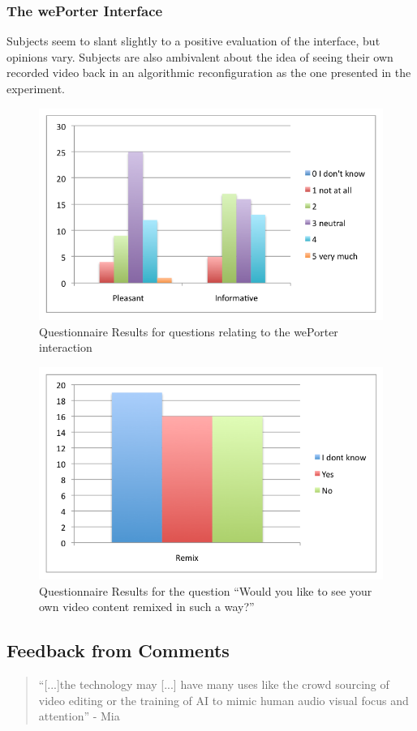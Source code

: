 \subsubsection{The wePorter Interface} 

Subjects seem to slant slightly to a positive evaluation of the interface, but opinions vary. Subjects are also ambivalent about the idea of seeing their own recorded video back in an algorithmic reconfiguration as the one presented in the experiment.

\begin{figure}[htbp]
  \centering
    \includegraphics[width=.6\textwidth]{img/evaluation/quest_interaction}
  \caption{Questionnaire Results for questions relating to the wePorter interaction}
  \label{fig:quest_interactions}
\end{figure}

\begin{figure}[htbp]
  \centering
    \includegraphics[width=.6\textwidth]{img/evaluation/quest_remix}
  \caption{Questionnaire Results for the question ``Would you like to see your own video content remixed in such a way?''}
  \label{fig:quest_remix}
\end{figure}


\subsection{Feedback from Comments} %
\label{sub:feedback_from_comments}

\begin{quote}
  ``[...]the technology may [...] have many uses like the crowd sourcing of video editing or the training of AI to mimic human audio visual focus and attention'' - Mia
\end{quote}

